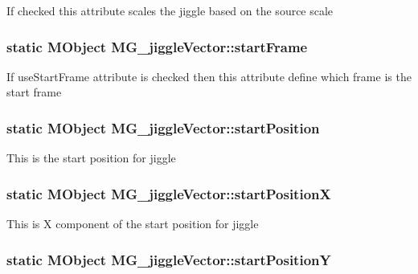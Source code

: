 If checked this attribute scales the jiggle based on the source scale \hypertarget{class_m_g__jiggle_vector_a2ffb1a14f9ead468f8dcf00df6c35652}{
\subsubsection[{start\-Frame}]{\setlength{\rightskip}{0pt plus 5cm}static M\-Object M\-G\-\_\-jiggle\-Vector\-::start\-Frame\hspace{0.3cm}{\ttfamily [static]}}}\label{class_m_g__jiggle_vector_a2ffb1a14f9ead468f8dcf00df6c35652}
If use\-Start\-Frame attribute is checked then this attribute define which frame is the start frame \hypertarget{class_m_g__jiggle_vector_a6731eddb749c12928566d0bcddb81983}{
\subsubsection[{start\-Position}]{\setlength{\rightskip}{0pt plus 5cm}static M\-Object M\-G\-\_\-jiggle\-Vector\-::start\-Position\hspace{0.3cm}{\ttfamily [static]}}}\label{class_m_g__jiggle_vector_a6731eddb749c12928566d0bcddb81983}
This is the start position for jiggle \hypertarget{class_m_g__jiggle_vector_a14684897a82ddbe91f4a111ec0b0fbf5}{
\subsubsection[{start\-Position\-X}]{\setlength{\rightskip}{0pt plus 5cm}static M\-Object M\-G\-\_\-jiggle\-Vector\-::start\-Position\-X\hspace{0.3cm}{\ttfamily [static]}}}\label{class_m_g__jiggle_vector_a14684897a82ddbe91f4a111ec0b0fbf5}
This is X component of the start position for jiggle \hypertarget{class_m_g__jiggle_vector_a322050f97129dd0040871b3d9921e360}{
\subsubsection[{start\-Position\-Y}]{\setlength{\rightskip}{0pt plus 5cm}static M\-Object M\-G\-\_\-jiggle\-Vector\-::start\-Position\-Y\hspace{0.3cm}{\ttfamily [static]}}}\label{class_m_g__jiggle_vector_a322050f97129dd0040871b3d9921e360}
